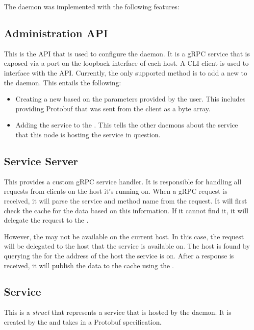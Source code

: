 \documentclass[12pt]{article}
\begin{document}
The daemon was implemented with the following features:

\subsection{Administration API}
\label{sec:api}
This is the API that is used to configure the daemon. It is a gRPC service that is exposed via a port on the loopback interface of each host.
A CLI client is used to interface with the API. Currently, the only supported method is to add a new \textit{} to the daemon.
This entails the following:
\begin{itemize}
    \item Creating a new \textit{} based on the parameters provided by the user.
          This includes providing Protobuf that was sent from the client as a byte array.
    \item Adding the service to the \textit{}. This tells the other daemons about the service that this
          node is hosting the service in question.
\end{itemize}

\subsection{Service Server}
\label{sec:server}
This provides a custom gRPC service handler. It is responsible for handling all requests from clients on the host it's running on.
When a gRPC request is received, it will parse the service and method name from the request.
It will first check the cache for the data based on this information. If it cannot find it,
it will delegate the request to the \textit{}.

However, the \textit{} may not be available on the current host. In this case, the request will be delegated to the host that the
service is available on. The host is found by querying the \textit{} for the address of the host the service is on.
After a response is received, it will publish the data to the cache using the \textit{}.

\subsection{Service}
\label{sec:service}
This is a \textit{struct} that represents a service that is hosted by the daemon. It is created by the \textit{} and
takes in a Protobuf specification.
\end{document}
